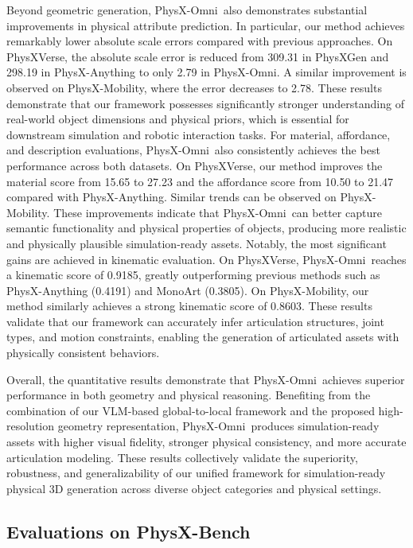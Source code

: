 \documentclass[11pt]{article}
\def\ourname{PhysX-Omni}
\def\ournewdata{PhysXVerse}
\def\ourbench{PhysX-Bench}
\begin{document}
Beyond geometric generation, \ourname\ also demonstrates substantial improvements in physical attribute prediction. In particular, our method achieves remarkably lower absolute scale errors compared with previous approaches. On \ournewdata, the absolute scale error is reduced from 309.31 in PhysXGen and 298.19 in PhysX-Anything to only 2.79 in \ourname. A similar improvement is observed on PhysX-Mobility, where the error decreases to 2.78. These results demonstrate that our framework possesses significantly stronger understanding of real-world object dimensions and physical priors, which is essential for downstream simulation and robotic interaction tasks. For material, affordance, and description evaluations, \ourname\ also consistently achieves the best performance across both datasets. On \ournewdata, our method improves the material score from 15.65 to 27.23 and the affordance score from 10.50 to 21.47 compared with PhysX-Anything. Similar trends can be observed on PhysX-Mobility. These improvements indicate that \ourname\ can better capture semantic functionality and physical properties of objects, producing more realistic and physically plausible simulation-ready assets. Notably, the most significant gains are achieved in kinematic evaluation. On \ournewdata, \ourname\ reaches a kinematic score of 0.9185, greatly outperforming previous methods such as PhysX-Anything (0.4191) and MonoArt (0.3805). On PhysX-Mobility, our method similarly achieves a strong kinematic score of 0.8603. These results validate that our framework can accurately infer articulation structures, joint types, and motion constraints, enabling the generation of articulated assets with physically consistent behaviors.

Overall, the quantitative results demonstrate that \ourname\ achieves superior performance in both geometry and physical reasoning. Benefiting from the combination of our VLM-based global-to-local framework and the proposed high-resolution geometry representation, \ourname\ produces simulation-ready assets with higher visual fidelity, stronger physical consistency, and more accurate articulation modeling. These results collectively validate the superiority, robustness, and generalizability of our unified framework for simulation-ready physical 3D generation across diverse object categories and physical settings.






\subsection{Evaluations on \ourbench}
\end{document}
